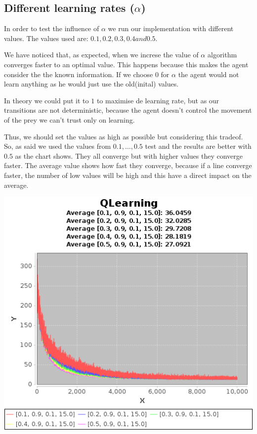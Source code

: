 \documentclass{article}
\begin{document}
\subsection{Different learning rates ($\alpha$)}
In order to test the influence of $\alpha$ we run our implementation with
different values. The values used are:
$0.1 , 0.2, 0.3, 0.4 and 0.5$. 

We have noticed that, as expected, when we increse the value of $\alpha$
algorithm converges faster to an optimal value. This happens because this makes the agent
consider the the known information. If we choose $0$ for $\alpha$ the agent
would not learn anything as he would just use the old(inital) values.

In theory we could put it to $1$ to maximise de learning rate, but as our
transitions are not deterministic, because the agent doesn't control the
movement of the prey we can't trust only on learning.

Thus, we should set the values as high as possible but considering this tradeof.
So, as said we used the values from $0.1, \ldots , 0.5$ test and the results are
better with $0.5$ as the chart shows. They all converge but with higher values
they converge faster. The average value shows how fast they converge, because if
a line converge faster, the number of low values will be high and this have a
direct impact on the average.

\includegraphics[]{res/alpha_01_to_05_gama_09_epsilon_01_IV_15.png}
\end{document}
